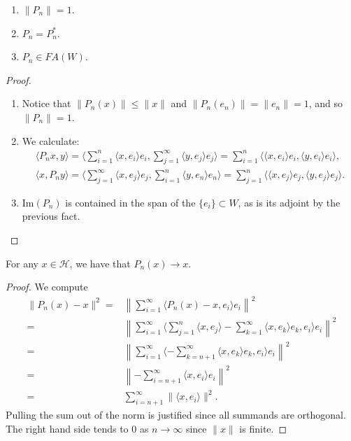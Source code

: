 \documentclass[12pt]{article}
\begin{document}
\begin{proposition}
\label{prop_pn_basic_facts}
	\hfill
	\begin{enumerate}
		\item $\|P_n\|=1$.
		\item $P_n=P_n^\ast$.
		\item $P_n\in FA(W)$.
	\end{enumerate}
\end{proposition}
\begin{proof}
	\hfill
	\begin{enumerate}
		\item Notice that $\|P_n(x)\|\leq \|x\|$ and $\|P_n(e_n)\|=\|e_n\|=1$, and so $\|P_n\|=1$.
		\item We calculate:
			\begin{gather*}
				\langle P_nx,y \rangle =\langle \sum_{i=1}^n \langle x,e_i \rangle e_i,\sum_{j=1}^\infty \langle y,e_j \rangle e_j \rangle  = \sum_{i=1}^n \langle \langle x,e_i \rangle e_i, \langle y,e_i \rangle e_i \rangle, \\
				\langle x,P_ny \rangle = \langle \sum_{j=1}^\infty \langle x,e_j \rangle e_j,\sum_{i=1}^n \langle y,e_n \rangle e_n \rangle =\sum_{j=1}^n \langle \langle x,e_j \rangle e_j, \langle y,e_j \rangle e_j \rangle .
			\end{gather*}
		\item $\text{Im}(P_n)$ is contained in the span of the $\{e_i\}\subset W$, as is its adjoint by the previous fact.
	\end{enumerate}
\end{proof}


\begin{proposition}
	For any $x\in \mathcal{H}$, we have that $P_n(x)\to x$. 	
\end{proposition}
\begin{proof}
	We compute
	\begin{align}
		\|P_n(x) - x\|^2=& \left\|\sum_{i=1}^\infty \langle P_n(x) - x, e_i \rangle e_i\right\|^2 \nonumber \\
		=& \left\| \sum_{i=1}^\infty \langle \sum_{j=1}^n \langle x, e_j \rangle - \sum_{k=1}^\infty \langle x, e_k \rangle e_k, e_i \rangle e_i \right\|^2 \nonumber \\
		=& \left\|\sum_{i=1}^\infty \langle -\sum_{k=n+1}^\infty \langle x,e_k \rangle e_k,e_i \rangle e_i \right\|^2 \nonumber \\
		=& \left\|-\sum_{i=n+1}^\infty \langle x,e_i \rangle e_i\right\|^2 \nonumber \\
		\label{eq_pnx_minus_x_squared}
		=& \sum_{i=n+1}^\infty \|\langle x,e_i \rangle \|^2.
	\end{align}
	Pulling the sum out of the norm is justified since all summands are orthogonal. The right hand side tends to 0 as $n\to \infty$ since $\|x\|$ is finite.
\end{proof}
\end{document}

